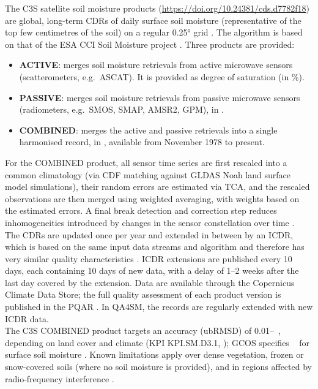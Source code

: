\noindent The \ac{C3S} satellite soil moisture products (\url{https://doi.org/10.24381/cds.d7782f18}) are global, long-term \acp{CDR} of daily surface soil moisture (representative of the top few centimetres of the soil) on a regular 0.25° grid \citep{c3satbd}.
The algorithm is based on that of the \ac{ESA} \ac{CCI} Soil Moisture project \citep{liu2012,dorigo2017,gruber2019}.
Three products are provided:
\begin{itemize}
    \item \textbf{ACTIVE}: merges soil moisture retrievals from active microwave sensors (scatterometers, e.g.\ \ac{ASCAT}). It is provided as degree of saturation (in \%).
    \item \textbf{PASSIVE}: merges soil moisture retrievals from passive microwave sensors (radiometers, e.g.\ \ac{SMOS}, \ac{SMAP}, AMSR2, GPM), in \unitsm{}.
    \item \textbf{COMBINED}: merges the active and passive retrievals into a single harmonised record, in \unitsm{}, available from November 1978 to present.
\end{itemize}
For the COMBINED product, all sensor time series are first rescaled into a common climatology (via CDF matching against \ac{GLDAS} Noah land surface model simulations), their random errors are estimated via \ac{TCA}, and the rescaled observations are then merged using weighted averaging, with weights based on the estimated errors.
A final break detection and correction step reduces inhomogeneities introduced by changes in the sensor constellation over time \citep{preimesberger2021}.
\\[1em]
\noindent The \acp{CDR} are updated once per year and extended in between by an \ac{ICDR}, which is based on the same input data streams and algorithm and therefore has very similar quality characteristics \citep{c3spqar}.
\ac{ICDR} extensions are published every 10 days, each containing 10 days of new data, with a delay of 1--2 weeks after the last day covered by the extension.
Data are available through the Copernicus Climate Data Store; the full quality assessment of each product version is published in the \ac{PQAR} \citep{c3spqar}.
In \ac{QA4SM}, the records are regularly extended with new \ac{ICDR} data.
\\[1em]
\noindent The \ac{C3S} COMBINED product targets an accuracy (\ac{ubRMSD}) of 0.01--\kpithres{}~\unitsm{}, depending on land cover and climate (\ac{KPI} KPI.SM.D3.1, \citealp{c3spqar}); \ac{GCOS} specifies \gcosthres{}~\unitsm{} for surface soil moisture \citep{gcos2022}.
Known limitations apply over dense vegetation, frozen or snow-covered soils (where no soil moisture is provided), and in regions affected by radio-frequency interference \citep{dorigo2017}.

